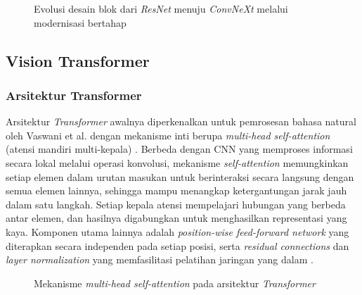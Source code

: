 \begin{figure}[h]
    \centering
    \fbox{\rule{0pt}{3.5cm}\rule{0.75\textwidth}{0pt}}
    \caption{Evolusi desain blok dari \textit{ResNet} menuju
    \textit{ConvNeXt} melalui modernisasi bertahap
    \cite{liu2022convnext}}
    \label{fig:convnext_block}
\end{figure}


\subsection{Vision Transformer} \label{II.Teori.ViT}

\subsubsection{Arsitektur Transformer}
Arsitektur \textit{Transformer} awalnya diperkenalkan untuk pemrosesan
bahasa natural oleh Vaswani et al. dengan mekanisme inti berupa
\textit{multi-head self-attention} (atensi mandiri multi-kepala)
\cite{vaswani2017attention}. Berbeda dengan CNN yang memproses
informasi secara lokal melalui operasi konvolusi, mekanisme
\textit{self-attention} memungkinkan setiap elemen dalam urutan masukan
untuk berinteraksi secara langsung dengan semua elemen lainnya,
sehingga mampu menangkap ketergantungan jarak jauh dalam satu langkah.
Setiap kepala atensi mempelajari hubungan yang berbeda antar elemen,
dan hasilnya digabungkan untuk menghasilkan representasi yang kaya.
Komponen utama lainnya adalah \textit{position-wise feed-forward network}
yang diterapkan secara independen pada setiap posisi, serta
\textit{residual connections} dan \textit{layer normalization} yang
memfasilitasi pelatihan jaringan yang dalam \cite{vaswani2017attention}. \par

\begin{figure}[h]
    \centering
    \fbox{\rule{0pt}{5cm}\rule{0.55\textwidth}{0pt}}
    \caption{Mekanisme \textit{multi-head self-attention} pada arsitektur
    \textit{Transformer} \cite{vaswani2017attention}}
    \label{fig:transformer_attention}
\end{figure}

